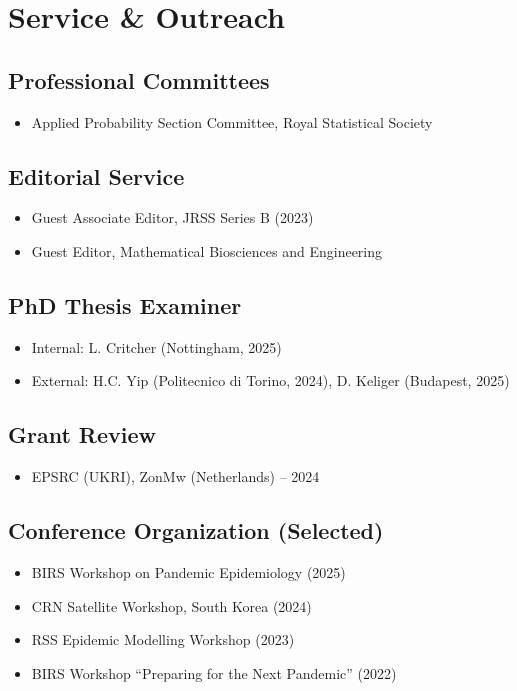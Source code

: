 \documentclass[11pt,a4paper,sans]{moderncv}
\begin{document}
\section{ Service \& Outreach}

\subsection{Professional Committees}
\begin{itemize}
    \item Applied Probability Section Committee, Royal Statistical Society
\end{itemize}

\subsection{Editorial Service}
\begin{itemize}
    \item Guest Associate Editor, JRSS Series B (2023)
    \item Guest Editor, Mathematical Biosciences and Engineering
\end{itemize}

\subsection{PhD Thesis Examiner}
\begin{itemize}
    \item Internal: L. Critcher (Nottingham, 2025)
    \item External: H.C. Yip (Politecnico di Torino, 2024), D. Keliger (Budapest, 2025)
\end{itemize}

\subsection{Grant Review}
\begin{itemize}
    \item EPSRC (UKRI), ZonMw (Netherlands) -- 2024
\end{itemize}

\subsection{Conference Organization (Selected)}
\begin{itemize}
    \item BIRS Workshop on Pandemic Epidemiology (2025)
    \item CRN Satellite Workshop, South Korea (2024)
    \item RSS Epidemic Modelling Workshop (2023)
    \item BIRS Workshop ``Preparing for the Next Pandemic'' (2022)
\end{itemize}
\end{document}
